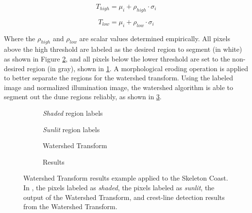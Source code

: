 \begin{equation}
T_{high}=\mu_{i}+\rho_{high}\cdot\sigma_{i}
\end{equation}

\begin{equation}
T_{low}=\mu_{i}+\rho_{low}\cdot\sigma_{i}
\end{equation}

Where the $\rho_{high}$ and $\rho_{low}$ are scalar values determined empirically. All pixels above the high threshold are labeled as the desired region to segment (in white) as shown in Figure \ref{fig:watershed_sunlit_side}, and all pixels below the lower threshold are set to the non-desired region (in gray), shown in \ref{fig:watershed_shaded_side}. A morphological eroding operation is applied to better separate the regions for the watershed transform. Using the labeled image and normalized illumination image, the watershed algorithm is able to segment out the dune regions reliably, as shown in \ref{fig:watershed_segmentation}. 

 \begin{figure}
 	\centering
 	\begin{subfigure}{0.48\textwidth}
 		\centering
 		\caption{\emph{Shaded} region labels}
 		\label{fig:watershed_shaded_side}
 	\end{subfigure}
 	\begin{subfigure}{0.48\textwidth}
 		\centering
 		\caption{\emph{Sunlit} region labels}
 		\label{fig:watershed_sunlit_side}
 	\end{subfigure}
 	\begin{subfigure}{0.48\textwidth}
 		\centering
 		\caption{Watershed Transform}
 		\label{fig:watershed_segmentation}
 	\end{subfigure}
 	\begin{subfigure}{0.48\textwidth}
 		\centering
 		\caption{Results}
 		\label{fig:watershed_dune_detection}
 	\end{subfigure} 
 	\caption{Watershed Transform results example applied to the Skeleton Coast. In , the pixels labeled as \emph{shaded},  the pixels labeled as \emph{sunlit},  the output of the Watershed Transform, and  crest-line detection results from the Watershed Transform. }
 	\label{fig:watershed_results}
 \end{figure}

